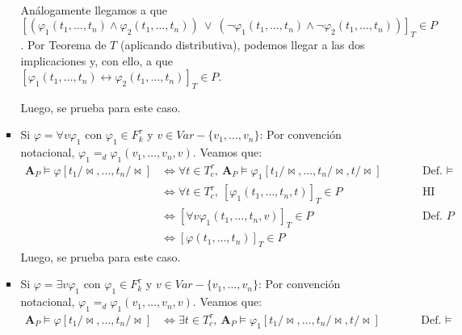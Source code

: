 \documentclass{article}
\begin{document}
\begin{enumerate}
\begin{itemize}
\begin{itemize}
\begin{equation*}
\begin{alignedat}{2}
                          \end{alignedat}
                        \end{equation*}
                        Análogamente llegamos a que $[(\varphi_1(t_1,\dots,t_n)\land\varphi_2(t_1,\dots,t_n))\ \lor\ (\neg\varphi_1(t_1,\dots,t_n)\land\neg\varphi_2(t_1,\dots,t_n))]_T\in P$. Por Teorema de $T$ (aplicando distributiva), podemos llegar a las dos implicaciones y, con ello, a que $[\varphi_1(t_1,\dots,t_n)\leftrightarrow\varphi_2(t_1,\dots,t_n)]_T\in P$.

                        Luego, se prueba para este caso.
                  \item Si $\varphi=\forall v\varphi_1$ con $\varphi_1\in F^\tau_k$ y $v\in Var-\{v_1,\dots,v_n\}$: Por convención notacional, $\varphi_1=_d\varphi_1(v_1,\dots,v_n,v)$. Veamos que:
                        \begin{equation*}
                          \begin{alignedat}{2}
                            \mathbf{A}_P\vDash\varphi[t_1/\!\bowtie,\dots,t_n/\!\bowtie] & \iff\forall t\in T^\tau_c,\ \mathbf{A}_P\vDash\varphi_1[t_1/\!\bowtie,\dots,t_n/\!\bowtie,t/\!\bowtie] &  & \qquad\text{Def. }\vDash \\
                                                                                         & \iff\forall t\in T^\tau_c,\ [\varphi_1(t_1,\dots,t_n,t)]_T\in P                                        &  & \qquad\text{HI}          \\
                                                                                         & \iff [\forall v\varphi_1(t_1,\dots,t_n,v)]_T\in P                                                      &  & \qquad\text{Def. }P      \\
                                                                                         & \iff [\varphi(t_1,\dots,t_n)]_T\in P
                          \end{alignedat}
                        \end{equation*}
                        Luego, se prueba para este caso.
                  \item Si $\varphi=\exists v\varphi_1$ con $\varphi_1\in F^\tau_k$ y $v\in Var-\{v_1,\dots,v_n\}$: Por convención notacional, $\varphi_1=_d\varphi_1(v_1,\dots,v_n,v)$. Veamos que:
                        \begin{equation*}
                          \begin{alignedat}{2}
                            \mathbf{A}_P\vDash\varphi[t_1/\!\bowtie,\dots,t_n/\!\bowtie] & \iff\exists t\in T^\tau_c,\ \mathbf{A}_P\vDash\varphi_1[t_1/\!\bowtie,\dots,t_n/\!\bowtie,t/\!\bowtie] &  & \qquad\text{Def. }\vDash \\

\end{alignedat}
\end{equation*}
\end{itemize}
\end{itemize}
\end{enumerate}
\end{document}
